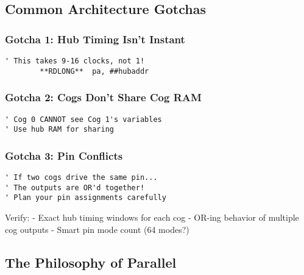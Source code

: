 \documentclass[11pt]{book}
\begin{document}
\hypertarget{common-architecture-gotchas}{%
\subsection{Common Architecture
Gotchas}\label{common-architecture-gotchas}}

\hypertarget{gotcha-1-hub-timing-isnt-instant}{%
\subsubsection{Gotcha 1: Hub Timing Isn't
Instant}\label{gotcha-1-hub-timing-isnt-instant}}

\begin{lstlisting}
' This takes 9-16 clocks, not 1!
        **RDLONG**  pa, ##hubaddr
\end{lstlisting}

\hypertarget{gotcha-2-cogs-dont-share-cog-ram}{%
\subsubsection{Gotcha 2: Cogs Don't Share Cog
RAM}\label{gotcha-2-cogs-dont-share-cog-ram}}

\begin{lstlisting}
' Cog 0 CANNOT see Cog 1's variables
' Use hub RAM for sharing
\end{lstlisting}

\hypertarget{gotcha-3-pin-conflicts}{%
\subsubsection{Gotcha 3: Pin Conflicts}\label{gotcha-3-pin-conflicts}}

\begin{lstlisting}
' If two cogs drive the same pin...
' The outputs are OR'd together!
' Plan your pin assignments carefully
\end{lstlisting}

\begin{review}
Verify:
- Exact hub timing windows for each cog
- OR-ing behavior of multiple cog outputs
- Smart pin mode count (64 modes?)
\end{review}

\hypertarget{the-philosophy-of-parallel}{%
\subsection{The Philosophy of
Parallel}\label{the-philosophy-of-parallel}}
\end{document}
